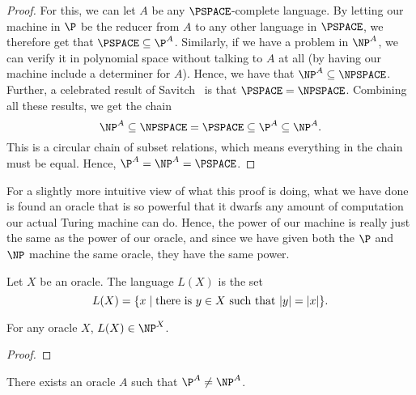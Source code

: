 \begin{proof}
  For this, we can let $A$ be any $\PSPACE$-complete language. By letting our
  machine in $\P$ be the reducer from $A$ to any other language in $\PSPACE$, we
  therefore get that $\PSPACE \subseteq \P^{A}$. Similarly, if we have a problem in
  $\NP^{A}$, we can verify it in polynomial space without talking to $A$ at all
  (by having our machine include a determiner for $A$). Hence, we have that
  $\NP^{A} \subseteq \NPSPACE$. Further, a celebrated result of Savitch~\cite{Sav70} is
  that $\PSPACE = \NPSPACE$. Combining all these results, we get the chain
  \begin{equation}
    \NP^{A} \subseteq \NPSPACE = \PSPACE \subseteq \P^{A} \subseteq \NP^{A}.
  \end{equation}
  This is a circular chain of subset relations, which means everything in the
  chain must be equal. Hence, $\P^{A} = \NP^{A} = \PSPACE$.
\end{proof}

For a slightly more intuitive view of what this proof is doing, what we have
done is found an oracle that is so powerful that it dwarfs any amount of
computation our actual Turing machine can do. Hence, the power of our machine is
really just the same as the power of our oracle, and since we have given both
the $\P$ and $\NP$ machine the same oracle, they have the same power.

\begin{defn}\label{def:l(x)}
  Let $X$ be an oracle. The language $L(X)$ is the set
  \begin{equation*}
    L(X) = \{x \mid \text{there is } y \in X \text{ such that } \lvert y\rvert = \lvert x\rvert\}.
  \end{equation*}
\end{defn}

\begin{lemma}
  For any oracle $X$, $L(X) \in \NP^{X}$.
\end{lemma}

\begin{proof}
\end{proof}

\begin{lemma}
\end{lemma}

\begin{thm}\label{thm:p-np-nrel}
  There exists an oracle $A$ such that $\P^{A} \ne \NP^{A}$.
\end{thm}

